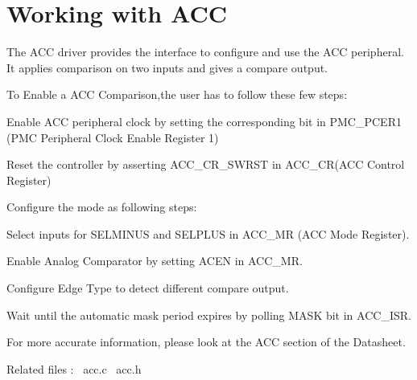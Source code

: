 \hypertarget{group__acc__module}{}\section{Working with A\+CC}
\label{group__acc__module}
The A\+CC driver provides the interface to configure and use the A\+CC peripheral.~\newline
 It applies comparison on two inputs and gives a compare output.

To Enable a A\+CC Comparison,the user has to follow these few steps\+: 
\begin{DoxyItemize}
\item Enable A\+CC peripheral clock by setting the corresponding bit in P\+M\+C\+\_\+\+P\+C\+E\+R1 (P\+MC Peripheral Clock Enable Register 1)  
\item Reset the controller by asserting A\+C\+C\+\_\+\+C\+R\+\_\+\+S\+W\+R\+ST in A\+C\+C\+\_\+\+CR(A\+CC Control Register)  
\item Configure the mode as following steps\+: 
\begin{DoxyEnumerate}
\item Select inputs for S\+E\+L\+M\+I\+N\+US and S\+E\+L\+P\+L\+US in A\+C\+C\+\_\+\+MR (A\+CC Mode Register).
\item Enable Analog Comparator by setting A\+C\+EN in A\+C\+C\+\_\+\+MR.
\item Configure Edge Type to detect different compare output.  
\end{DoxyEnumerate}
\item Wait until the automatic mask period expires by polling M\+A\+SK bit in A\+C\+C\+\_\+\+I\+SR. 
\end{DoxyItemize}

For more accurate information, please look at the A\+CC section of the Datasheet.

Related files \+:~\newline
acc.\+c~\newline
 acc.\+h~\newline
 